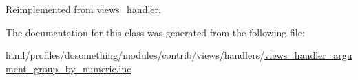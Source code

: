 Reimplemented from \hyperlink{classviews__handler_ae81019ed08d9c3f5bca3d16c69e7b39f}{views\_\-handler}.

The documentation for this class was generated from the following file:\begin{DoxyCompactItemize}
\item 
html/profiles/dosomething/modules/contrib/views/handlers/\hyperlink{views__handler__argument__group__by__numeric_8inc}{views\_\-handler\_\-argument\_\-group\_\-by\_\-numeric.inc}\end{DoxyCompactItemize}
